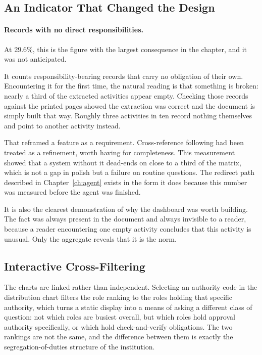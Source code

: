 \subsection{An Indicator That Changed the Design}

\paragraph{Records with no direct responsibilities.} At 29.6\%, this is the figure with the
largest consequence in the chapter, and it was not anticipated.

It counts responsibility-bearing records that carry no obligation of their own. Encountering
it for the first time, the natural reading is that something is broken: nearly a third of the
extracted activities appear empty. Checking those records against the printed pages showed the
extraction was correct and the document is simply built that way. Roughly three activities in
ten record nothing themselves and point to another activity instead.

That reframed a feature as a requirement. Cross-reference following had been treated as a
refinement, worth having for completeness. This measurement showed that a system without it
dead-ends on close to a third of the matrix, which is not a gap in polish but a failure on
routine questions. The redirect path described in Chapter~\ref{ch:agent} exists in the form it
does because this number was measured before the agent was finished.

It is also the clearest demonstration of why the dashboard was worth building. The fact was
always present in the document and always invisible to a reader, because a reader
encountering one empty activity concludes that this activity is unusual. Only the aggregate
reveals that it is the norm.

\subsection{Interactive Cross-Filtering}

The charts are linked rather than independent. Selecting an authority code in the
distribution chart filters the role ranking to the roles holding that specific authority,
which turns a static display into a means of asking a different class of question: not
which roles are busiest overall, but which roles hold approval authority specifically, or
which hold check-and-verify obligations. The two rankings are not the same, and the
difference between them is exactly the segregation-of-duties structure of the institution.

